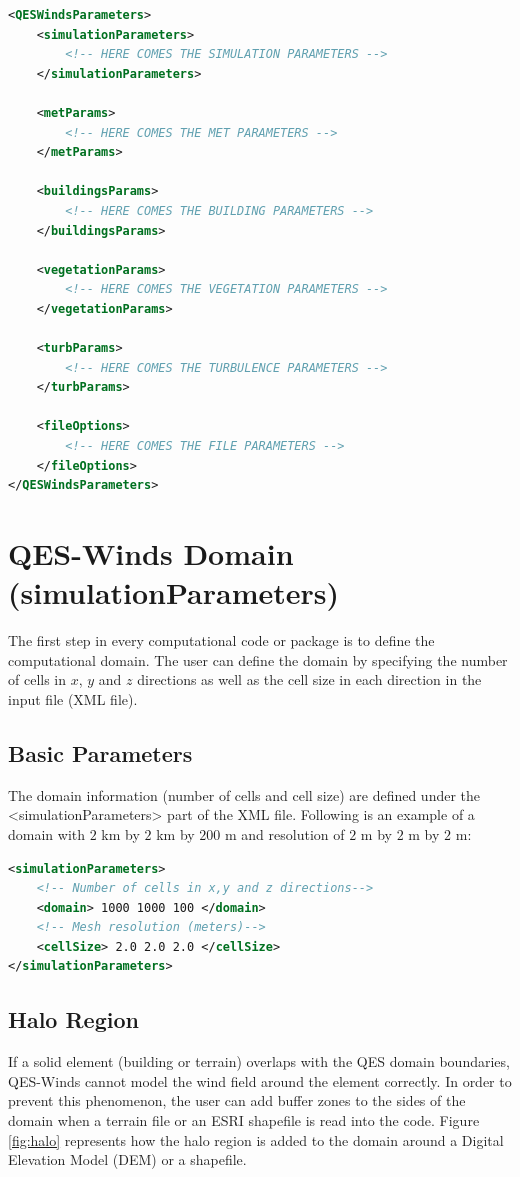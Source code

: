\begin{lstlisting}[language=XML]
<QESWindsParameters>
	<simulationParameters>
		<!-- HERE COMES THE SIMULATION PARAMETERS -->
	</simulationParameters>
		
	<metParams>
		<!-- HERE COMES THE MET PARAMETERS -->
	</metParams>
	
	<buildingsParams>
		<!-- HERE COMES THE BUILDING PARAMETERS -->
	</buildingsParams>

	<vegetationParams>
		<!-- HERE COMES THE VEGETATION PARAMETERS -->
	</vegetationParams>	
	
	<turbParams>
		<!-- HERE COMES THE TURBULENCE PARAMETERS -->
	</turbParams>							
	
	<fileOptions>
		<!-- HERE COMES THE FILE PARAMETERS -->
	</fileOptions>
</QESWindsParameters>
\end{lstlisting}


\section{QES-Winds Domain (simulationParameters)}

The first step in every computational code or package is to define the computational domain. The user can define the domain by specifying the number of cells in $x$, $y$ and $z$ directions as well as the cell size in each direction in the input file (XML file).

\subsection{Basic Parameters}

The domain information (number of cells and cell size) are defined under the <simulationParameters> part of the XML file. Following is an example of a domain with $2$ km by $2$ km by $200$ m and resolution of $2$ m by $2$ m by $2$ m:

\begin{lstlisting}[language=XML]
<simulationParameters>
	<!-- Number of cells in x,y and z directions-->
  	<domain> 1000 1000 100 </domain>	
  	<!-- Mesh resolution (meters)-->				
  	<cellSize> 2.0 2.0 2.0 </cellSize> 				
</simulationParameters>
\end{lstlisting}

\subsection{Halo Region}

If a solid element (building or terrain) overlaps with the QES domain boundaries, QES-Winds cannot model the wind field around the element correctly. In order to prevent this phenomenon, the user can add buffer zones to the sides of the domain when a terrain file or an ESRI shapefile is read into the code. Figure \ref{fig:halo} represents how the halo region is added to the domain around a Digital Elevation Model (DEM) or a shapefile.


